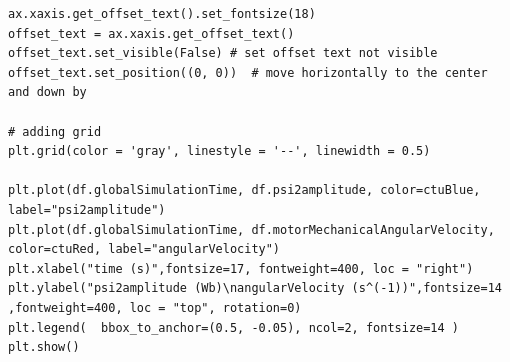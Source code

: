 \documentclass[a4paper, twoside, 11pt]{article}
\begin{document}
\begin{appendices}
\begin{lstlisting}
ax.xaxis.get_offset_text().set_fontsize(18)
offset_text = ax.xaxis.get_offset_text()
offset_text.set_visible(False) # set offset text not visible
offset_text.set_position((0, 0))  # move horizontally to the center and down by 

# adding grid
plt.grid(color = 'gray', linestyle = '--', linewidth = 0.5)

plt.plot(df.globalSimulationTime, df.psi2amplitude, color=ctuBlue, label="psi2amplitude")
plt.plot(df.globalSimulationTime, df.motorMechanicalAngularVelocity, color=ctuRed, label="angularVelocity")
plt.xlabel("time (s)",fontsize=17, fontweight=400, loc = "right")
plt.ylabel("psi2amplitude (Wb)\nangularVelocity (s^(-1))",fontsize=14 ,fontweight=400, loc = "top", rotation=0)
plt.legend(  bbox_to_anchor=(0.5, -0.05), ncol=2, fontsize=14 )
plt.show()\end{lstlisting}

	\end{appendices}
\end{document}
